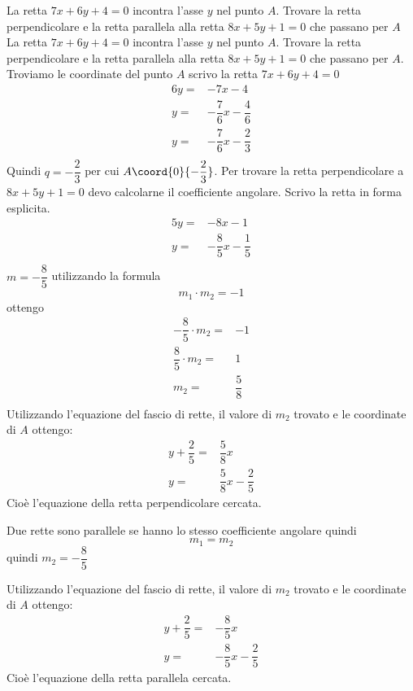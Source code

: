 \begin{exercise}
	La retta $7x+6y+4=0$ incontra l'asse $y$ nel punto $A$. Trovare la retta perpendicolare e la retta parallela alla retta $8x+5y+1=0$ che passano per $A$
	\tcblower
	La retta $7x+6y+4=0$ incontra l'asse $y$ nel punto $A$. Trovare la retta perpendicolare e la retta parallela alla retta $8x+5y+1=0$ che passano per $A$.
	Troviamo le coordinate del punto $A$ scrivo la retta  $7x+6y+4=0$
	\begin{align*}
	6y=&-7x-4\\
	y=&-\dfrac{7}{6}x-\dfrac{4}{6}\\
	y=&-\dfrac{7}{6}x-\dfrac{2}{3}\\
	\end{align*}
	Quindi $q=-\dfrac{2}{3}$ per cui $A\coord{0}{-\dfrac{2}{3}}$. Per trovare la retta perpendicolare a $8x+5y+1=0$ devo calcolarne il coefficiente angolare.
	Scrivo la retta in forma esplicita.
		\begin{align*}
		5y=&-8x-1\\
		y=&-\dfrac{8}{5}x-\dfrac{1}{5}\\
		\end{align*}
	$m=-\dfrac{8}{5}$ utilizzando la formula \[m_1\cdot m_2=-1\] ottengo
	\begin{align*}
-\dfrac{8}{5}\cdot m_2=&-1\\
\dfrac{8}{5}\cdot m_2=&1\\
 m_2=&\dfrac{5}{8}\\
	\end{align*}
	Utilizzando l'equazione del fascio di rette, il valore di $m_2$ trovato e le coordinate di $A$ ottengo:
	\begin{align*}
	y+\dfrac{2}{5}=&\dfrac{5}{8}x\\
		y=&\dfrac{5}{8}x-\dfrac{2}{5}
	\end{align*}
	Cioè l'equazione della retta perpendicolare cercata.
	
	Due rette sono parallele se hanno lo stesso coefficiente angolare quindi \[m_1=m_2 \]
	quindi $m_2=-\dfrac{8}{5}$ 
	
	Utilizzando l'equazione del fascio di rette, il valore di $m_2$ trovato e le coordinate di $A$ ottengo:
		\begin{align*}
		y+\dfrac{2}{5}=&-\dfrac{8}{5}x\\
		y=&-\dfrac{8}{5}x-\dfrac{2}{5}
		\end{align*}
	Cioè l'equazione della retta parallela cercata.		
	\begin{center}

\end{center}
\end{exercise}
